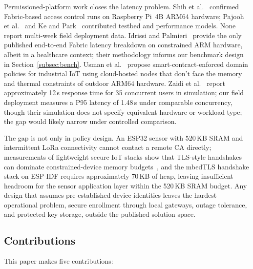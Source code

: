 \documentclass[a4paper,fleqn]{cas-dc}
\begin{document}
Permissioned-platform work closes the latency problem. Shih et
al.~\cite{shih2022iiot} confirmed Fabric-based access control runs on
Raspberry Pi~4B ARM64 hardware; Pajooh et al.~\cite{pajooh2022fabric_iot}
and Ke and Park~\cite{kepark2023fabric_model} contributed testbed and
performance models. None report multi-week field deployment data.
Idrissi and Palmieri~\cite{idrissi2024blockchain_jsupercomput} provide
the only published end-to-end Fabric latency breakdown on constrained
ARM hardware, albeit in a healthcare context; their methodology informs
our benchmark design in Section~\ref{subsec:bench}. Usman et al.~\cite{usman2024blockchain} propose
smart-contract-enforced domain policies for industrial IoT using
cloud-hosted nodes that don't face the memory and thermal constraints of
outdoor ARM64 hardware. Zaidi et al.~\cite{zaidi2023fabrication} report
approximately 12\,s response time for 35 concurrent users in simulation;
our field deployment measures a P95 latency of 1.48\,s under comparable
concurrency, though their simulation does not specify equivalent hardware
or workload type; the gap would likely narrow under controlled comparison.

The gap is not only in policy design. An ESP32 sensor with 520\,KB
SRAM and intermittent LoRa connectivity cannot contact a remote CA
directly; measurements of lightweight secure IoT stacks show that TLS-style
handshakes can dominate constrained-device memory budgets~\cite{raza2013lithe},
and the mbedTLS handshake stack on ESP-IDF requires approximately
70\,KB of heap, leaving insufficient headroom for the sensor application
layer within the 520\,KB SRAM budget. Any design
that assumes pre-established device identities leaves the hardest
operational problem, secure enrollment through local gateways, outage
tolerance, and protected key storage, outside the published solution
space.

\subsection{Contributions}
\label{subsec:contributions}

This paper makes five contributions:
\end{document}
